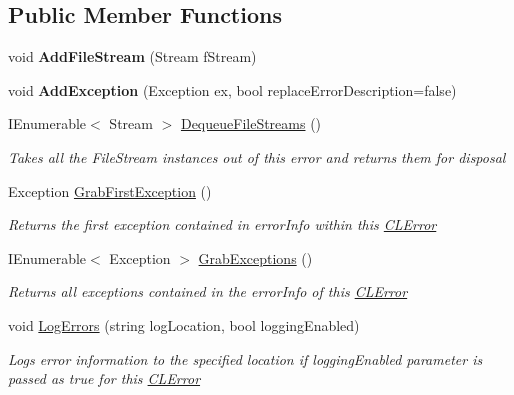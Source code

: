 \subsection*{Public Member Functions}
\begin{DoxyCompactItemize}
\item 
\hypertarget{class_cloud_api_public_1_1_model_1_1_c_l_error_a1d9c11f935bc256bf2ef4b166eeee77f}{void {\bfseries Add\-File\-Stream} (Stream f\-Stream)}\label{class_cloud_api_public_1_1_model_1_1_c_l_error_a1d9c11f935bc256bf2ef4b166eeee77f}

\item 
\hypertarget{class_cloud_api_public_1_1_model_1_1_c_l_error_a4e663afbfc99de8521f9a9440b3eb410}{void {\bfseries Add\-Exception} (Exception ex, bool replace\-Error\-Description=false)}\label{class_cloud_api_public_1_1_model_1_1_c_l_error_a4e663afbfc99de8521f9a9440b3eb410}

\item 
I\-Enumerable$<$ Stream $>$ \hyperlink{class_cloud_api_public_1_1_model_1_1_c_l_error_a74f5cb28db3f4ca09c664298a2381d52}{Dequeue\-File\-Streams} ()
\begin{DoxyCompactList}\small\item\em Takes all the File\-Stream instances out of this error and returns them for disposal \end{DoxyCompactList}\item 
Exception \hyperlink{class_cloud_api_public_1_1_model_1_1_c_l_error_add9bcf1572e5b8777988ee71fe3667c7}{Grab\-First\-Exception} ()
\begin{DoxyCompactList}\small\item\em Returns the first exception contained in error\-Info within this \hyperlink{class_cloud_api_public_1_1_model_1_1_c_l_error}{C\-L\-Error} \end{DoxyCompactList}\item 
I\-Enumerable$<$ Exception $>$ \hyperlink{class_cloud_api_public_1_1_model_1_1_c_l_error_a7bccb3f868f332915fe9b5bbcd5cfde3}{Grab\-Exceptions} ()
\begin{DoxyCompactList}\small\item\em Returns all exceptions contained in the error\-Info of this \hyperlink{class_cloud_api_public_1_1_model_1_1_c_l_error}{C\-L\-Error} \end{DoxyCompactList}\item 
void \hyperlink{class_cloud_api_public_1_1_model_1_1_c_l_error_a9aac3e16ec24c2e9008f711187730cd9}{Log\-Errors} (string log\-Location, bool logging\-Enabled)
\begin{DoxyCompactList}\small\item\em Logs error information to the specified location if logging\-Enabled parameter is passed as true for this \hyperlink{class_cloud_api_public_1_1_model_1_1_c_l_error}{C\-L\-Error} \end{DoxyCompactList}\end{DoxyCompactItemize}
